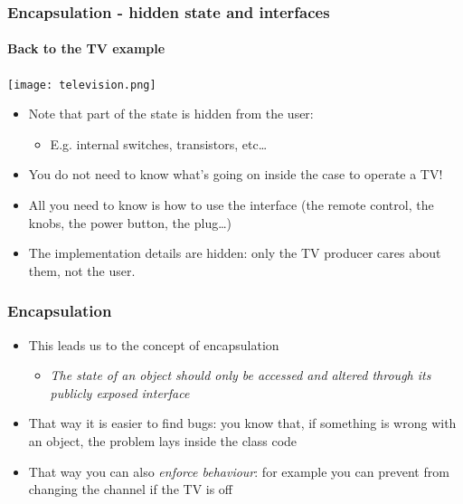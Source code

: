\documentclass[9pt]{beamer}
\begin{document}
\begin{frame}
  \frametitle{Encapsulation - hidden state and interfaces}
  \framesubtitle{Back to the TV example}

  \centering\texttt{[image: television.png]}

  \bigskip

  \begin{itemize}
  \item Note that part of the state is hidden from the user:
    \begin{itemize}
    \item E.g. internal switches, transistors, etc\dots
    \end{itemize}
  \smallskip
  \item You do not need to know what's going on inside the case to operate a TV!
  \smallskip
  \item All you need to know is how to use the \alert{interface} (the remote
        control, the knobs, the power button, the plug\dots)
  \smallskip
  \item The \alert{implementation} details are hidden: only the TV producer cares about
        them, not the user.
  \end{itemize}

\end{frame}


\begin{frame}
  \frametitle{Encapsulation}

  \begin{itemize}
    \item This leads us to the concept of \alert{encapsulation}
    \bigskip
    \begin{itemize}
      \item \emph{The state of an object should only be accessed and altered
                  through its publicly exposed interface}
    \end{itemize}
    \bigskip
    \item That way it is easier to find bugs: you know that, if something is wrong
          with an object, the problem lays inside the class code
    \bigskip
    \item That way you can also \emph{enforce behaviour}: for example you can
          prevent from changing the channel if the TV is off

  \end{itemize}

\end{frame}
\end{document}
